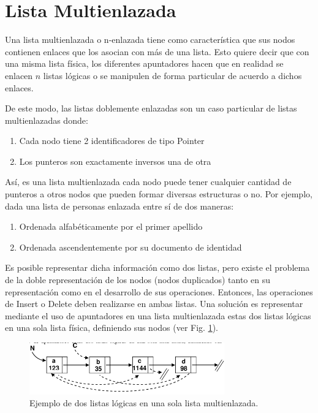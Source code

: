 \section{Lista Multienlazada}

Una lista multienlazada o n-enlazada tiene como característica que sus nodos contienen enlaces que los asocian con más de una lista. Esto quiere decir que con una misma lista física, los diferentes apuntadores hacen que en realidad se enlacen $n$ listas lógicas o se manipulen de forma particular de acuerdo a dichos enlaces.

De este modo, las listas doblemente enlazadas son un caso particular de listas multienlazadas donde:
\begin{enumerate}
\item Cada nodo tiene 2 identificadores de tipo Pointer
\item Los punteros son exactamente inversos una de otra
\end{enumerate}

Así, es una lista multienlazada cada nodo puede tener cualquier cantidad de punteros a otros nodos que pueden formar diversas estructuras o no. Por ejemplo, dada una lista de personas enlazada entre sí de dos maneras:
\begin{enumerate}
\item Ordenada alfabéticamente por el primer apellido
\item Ordenada ascendentemente por su documento de identidad
\end{enumerate}

Es posible representar dicha información como dos listas, pero existe el problema de la doble representación de los nodos (nodos duplicados) tanto en su representación como en el desarrollo de sus operaciones. Entonces, las operaciones de Insert o Delete deben realizarse en ambas listas. Una solución es representar mediante el uso de apuntadores en una lista multienlazada estas dos listas lógicas en una sola lista física, definiendo sus nodos (ver Fig. \ref{fig:multifirst}).
 
\begin{figure}[htp!]
  \begin{center}
    \includegraphics[width=0.75\textwidth]{images/first.png}
  \end{center}
  \caption{Ejemplo de dos listas lógicas en una sola lista multienlazada.}
  \label{fig:multifirst}
\end{figure}
 
